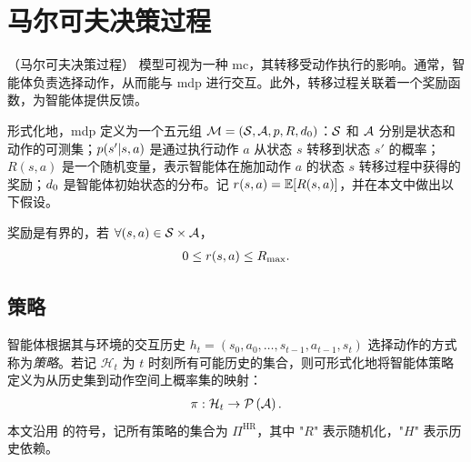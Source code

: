 \section{马尔可夫决策过程}
\label{sec:mdp}

（马尔可夫决策过程）\cite{puterman1994markov} 模型可视为一种 \gls{mc}，其转移受动作执行的影响。通常，智能体负责选择动作，从而能与 \gls{mdp} 进行交互。此外，转移过程关联着一个奖励函数，为智能体提供反馈。

形式化地，\gls{mdp} 定义为一个五元组 $\mathcal{M} = (\mathcal{S},\mathcal{A}, p, R, d_0)$：$\mathcal{S}$ 和 $\mathcal{A}$ 分别是状态和动作的可测集；$p(s'\vert s,a)$ 是通过执行动作 $a$ 从状态 $s$ 转移到状态 $s'$ 的概率；$R(s,a)$ 是一个随机变量，表示智能体在施加动作 $a$ 的状态 $s$ 转移过程中获得的奖励；$d_0$ 是智能体初始状态的分布。记 $r(s,a)=\operatorname*{\mathbb{E}}[R(s,a)]$，并在本文中做出以下假设。

\begin{ass}[有界奖励]
    奖励是有界的，若 $\forall (s,a)\in\mathcal{S}\times\mathcal{A}$，
    \begin{align*}
        0\le r(s,a)\le {R_{\max}}.
    \end{align*}
\end{ass}


\subsection{策略}
\label{subsec:policies}
智能体根据其与环境的交互历史 $h_t=(s_0,a_0,\dots,s_{t-1},a_{t-1},s_t)$ 选择动作的方式称为\emph{策略}。若记 $\mathcal{H}_t$ 为 $t$ 时刻所有可能历史的集合，则可形式化地将智能体策略定义为从历史集到动作空间上概率集的映射：
\begin{align*}
    \pi:\mathcal{H}_t\rightarrow\mathcal{P}\left(\mathcal{A}\right).
\end{align*}
本文沿用 \cite{puterman1994markov} 的符号，记所有策略的集合为 $\Pi^{\text{HR}}$，其中 "$R$" 表示随机化，"$H$" 表示历史依赖。

